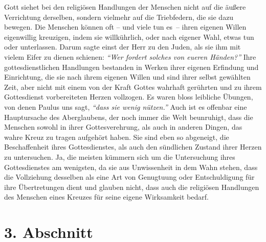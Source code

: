  Gott siehet bei den religiösen
Handlungen der Menschen nicht auf die äußere
Verrichtung derselben, sondern vielmehr auf die Triebfedern, die sie dazu
bewegen.  Die Menschen können oft -- und viele
tun es~-- ihren eigenen Willen
eigenwillig kreuzigen, indem sie willkührlich, oder nach eigener Wahl, etwas
tun oder
unterlassen. Darum sagte einst der Herr zu den Juden, als
sie ihm
mit vielem
Eifer zu dienen schienen:
\textit{"`Wer fordert solches von eueren Händen?"'}
 Ihre
gottesdienstlichen Handlungen bestanden in Werken ihrer eigenen Erfindung und
Einrichtung, die sie nach ihrem eigenen Willen und sind ihrer selbst gewählten
Zeit, aber nicht mit einem von der Kraft Gottes wahrhaft gerührten und zu ihrem
Gottesdienst vorbereiteten Herzen vollzogen. Es waren bloss leibliche Übungen,
von denen
Paulus uns sagt,
\textit{"`dass sie wenig nützen."'} Auch ist es offenbar eine
Hauptursache des Aberglaubens, der noch
immer die Welt beunruhigt, dass die Menschen sowohl in ihrer Gottesverehrung,
als auch in anderen Dingen, das wahre Kreuz zu tragen aufgehört haben. Sie sind
eben so abgeneigt, die Beschaffenheit ihres Gottesdienstes, als auch den
sündlichen Zustand ihrer Herzen zu untersuchen. Ja,
die meisten kümmern sich um die Untersuchung ihres Gottesdienstes am
wenigsten, da sie aus Unwissenheit in
dem Wahn stehen, dass die Vollziehung desselben als eine Art von Genugtuung
oder Entschuldigung für ihre Übertretungen dient und glauben nicht, dass auch
die religiösen Handlungen des Menschen eines Kreuzes für seine eigene
Wirksamkeit bedarf.

\section{3. Abschnitt} \label{kap6_ab3}

